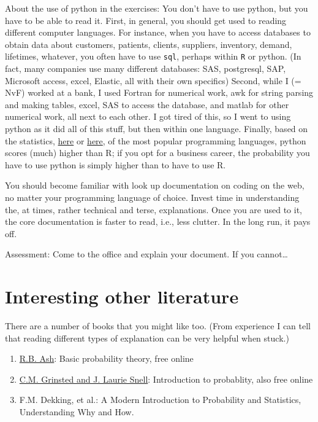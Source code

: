 \documentclass[a4paper]{article}
\theoremstyle{definition}
\newcommand{\1}[1]{\,I_{#1}} %
\begin{document}
About the use of python in the exercises: You don't have to use python, but you have to be able to read it.
First, in general, you should get used to reading different computer languages.
For instance, when you have to access databases to obtain data about customers, patients, clients, suppliers, inventory, demand, lifetimes, whatever, you often have to use \texttt{sql}, perhaps within \texttt{R} or python.
(In fact, many companies use many different databases: SAS, postgresql, SAP, Microsoft access, excel, Elastic, all with their own specifics) Second, while I (= NvF) worked at a bank, I used Fortran for numerical work, awk for string parsing and making tables, excel, SAS to access the database, and matlab for other numerical work, all next to each other.
I got tired of this, so I went to using python as it did all of this stuff, but then within one language.
Finally, based on the statistics, \href{https://www.tiobe.com/tiobe-index/}{here} or \href{https://www.northeastern.edu/graduate/blog/most-popular-programming-languages/}{here}, of the most popular programming languages, python scores (much) higher than R; if you opt for a business career, the probability you have to use python is simply higher than to have to use R.

You should become familiar with look up documentation on coding on the web, no matter your programming language of choice. Invest time in understanding the, at times, rather technical and terse, explanations.  Once you are used to it, the core documentation is faster to read, i.e., less clutter. In the long run, it pays off. 


Assessment: Come to the office and explain your document. If you cannot\ldots



\section{Interesting other literature}
\label{sec:orgc63e701}

There are a number of books that you might like too. (From experience I can tell that reading different types of explanation can be very helpful when stuck.)
\begin{enumerate}
\item \href{https://faculty.math.illinois.edu/\~r-ash/BPT.html}{R.B. Ash}: Basic probability theory, free online
\item \href{https://math.dartmouth.edu/\~prob/prob/prob.pdf}{C.M. Grinsted and J. Laurie Snell}: Introduction to probablity, also free online
\item F.M. Dekking, et al.: A Modern Introduction to Probability and Statistics, Understanding Why and How.
\end{enumerate}
\end{document}
